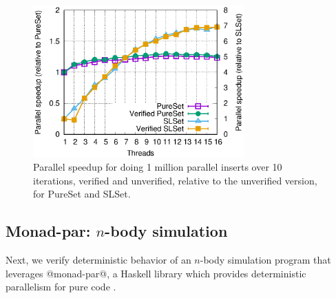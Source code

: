 \begin{figure}
\captionsetup{justification=centering}
  \begin{center}
    \includegraphics[width=3.2in]{text/refinementreflection/set.eps}
  \end{center}
  \caption[Parallel speedup for PureSet and SLSet.]
    {Parallel speedup for doing 1 million parallel inserts over 10
    iterations, verified and unverified, relative to the unverified version,
    for PureSet and SLSet.}
  \label{fig:set}
\end{figure}

\subsection{Monad-par: \texorpdfstring{$n$-body}{n-body} simulation}
\label{sec:nbody}
Next, we verify deterministic behavior of an
$n$-body simulation program that leverages @monad-par@, a Haskell library which
provides deterministic parallelism for pure code \cite{monad-par}.

